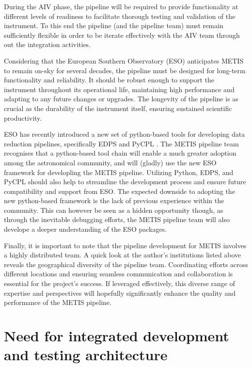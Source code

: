 \documentclass[a4paper]{spie}  %
\begin{document}
During the AIV phase, the pipeline will be required to provide functionality at different levels of readiness to facilitate thorough testing and validation of the instrument. 
To this end the pipeline (and the pipeline team) must remain sufficiently flexible in order to be iterate effectively with the AIV team through out the integration activities.

Considering that the European Southern Observatory (ESO) anticipates METIS to remain on-sky for several decades, the pipeline must be designed for long-term functionality and reliability. 
It should be robust enough to support the instrument throughout its operational life, maintaining high performance and adapting to any future changes or upgrades. 
The longevity of the pipeline is as crucial as the durability of the instrument itself, ensuring sustained scientific productivity.

ESO has recently introduced a new set of python-based tools for developing data reduction pipelines, specifically EDPS \cite{edps} and PyCPL \cite{pycpl}. 
The METIS pipeline team recognises that a python-based tool chain will enable a much greater adoption among the astronomical community, and will (gladly) use the new ESO framework for developling the METIS pipeline. 
Utilizing Python, EDPS, and PyCPL should also help to streamline the development process and ensure future compatibility and support from ESO.
The expected downside to adopting the new python-based framework is the lack of previous experience within the community.
This can however be seen as a hidden opportunity though, as through the inevitable debugging efforts, the METIS pipeline team will also develope a deeper understanding of the ESO packages.

Finally, it is important to note that the pipeline development for METIS involves a highly distributed team. 
A quick look at the author's institutions listed above reveals the geographical diversity of the pipeline team.
Coordinating efforts across different locations and ensuring seamless communication and collaboration is essential for the project's success. 
If leveraged effectively, this diverse range of expertise and perspectives will hopefully significantly enhance the quality and performance of the METIS pipeline.




\section{Need for integrated development and testing architecture}
\label{sec:dev}
\end{document}
